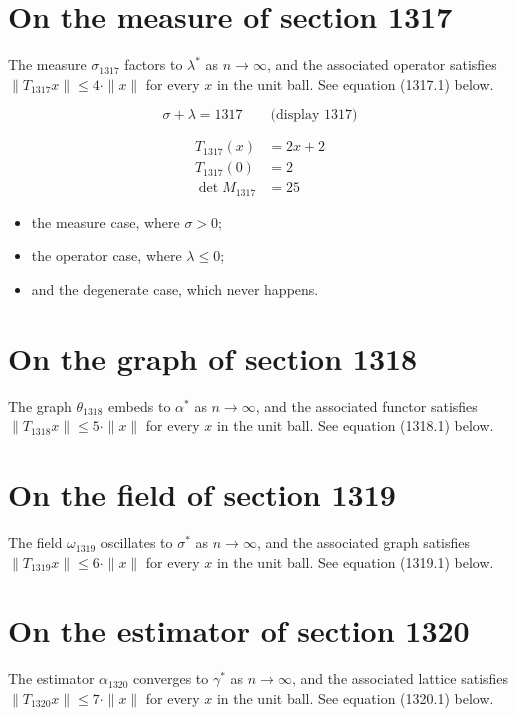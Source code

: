\documentclass{article}
\begin{document}
\section{On the measure of section 1317}
The measure $\sigma_{1317}$ factors to $\lambda^{*}$ as $n \to \infty$,
and the associated operator satisfies $\|T_{1317} x\| \leq 4 \cdot \|x\|$
for every $x$ in the unit ball. See equation (1317.1) below.

$$
\sigma + \lambda = 1317 \qquad \text{(display 1317)}
$$

\begin{align}
T_{1317}(x) &= 2 x + 2 \\
T_{1317}(0) &= 2 \\
\det M_{1317} &= 25
\end{align}

\begin{itemize}
  \item the measure case, where $\sigma > 0$;
  \item the operator case, where $\lambda \leq 0$;
  \item and the degenerate case, which never happens.
\end{itemize}

\section{On the graph of section 1318}
The graph $\theta_{1318}$ embeds to $\alpha^{*}$ as $n \to \infty$,
and the associated functor satisfies $\|T_{1318} x\| \leq 5 \cdot \|x\|$
for every $x$ in the unit ball. See equation (1318.1) below.

\section{On the field of section 1319}
The field $\omega_{1319}$ oscillates to $\sigma^{*}$ as $n \to \infty$,
and the associated graph satisfies $\|T_{1319} x\| \leq 6 \cdot \|x\|$
for every $x$ in the unit ball. See equation (1319.1) below.

\section{On the estimator of section 1320}
The estimator $\alpha_{1320}$ converges to $\gamma^{*}$ as $n \to \infty$,
and the associated lattice satisfies $\|T_{1320} x\| \leq 7 \cdot \|x\|$
for every $x$ in the unit ball. See equation (1320.1) below.
\end{document}

